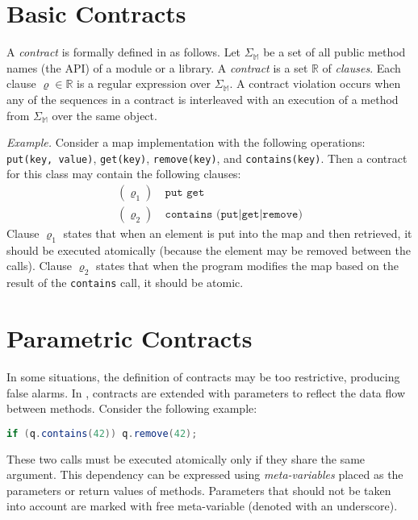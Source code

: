 \section{Basic Contracts}
\label{basicContracts}

A \emph{contract} is formally defined in \cite{FITPUB10817} as follows. Let
$\Sigma_\mathbb{M}$ be a set of all public method names (the API) of a module or
a library. A \emph{contract} is a set $\mathbb{R}$ of \emph{clauses}. Each
clause $\varrho \in \mathbb{R}$ is a regular expression over
$\Sigma_\mathbb{M}$. A contract violation occurs when any of the sequences in a
contract is interleaved with an execution of a method from $\Sigma_\mathbb{M}$
over the same object.

\emph{Example.} Consider a map implementation with the following operations:
\texttt{put(key, value)}, \texttt{get(key)}, \texttt{remove(key)}, and
\texttt{contains(key)}. Then a contract for this class may contain the following
clauses:
\begin{align*}
    (\varrho_1) &\ \texttt{put get}\\
    (\varrho_2) &\ \texttt{contains (put|get|remove)}
\end{align*}
Clause $\varrho_1$ states that when an element is put into the map and then
retrieved, it should be executed atomically (because the element may be removed
between the calls). Clause $\varrho_2$ states that when the program modifies the
map based on the result of the \texttt{contains} call, it should be atomic.

\section{Parametric Contracts}
\label{parametricContracts}

In some situations, the definition of contracts may be too restrictive,
producing false alarms. In \cite{contracts}, contracts are extended with
parameters to reflect the data flow between methods. Consider the following
example:
\begin{lstlisting}[language=java]
if (q.contains(42)) q.remove(42);
\end{lstlisting}

These two calls must be executed atomically only if they share the same
argument. This dependency can be expressed using \emph{meta-variables} placed as
the parameters or return values of methods. Parameters that should not be taken
into account are marked with free meta-variable (denoted with an underscore).

